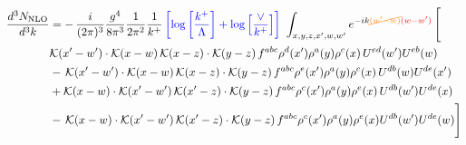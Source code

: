 \documentclass[aps,prd,amsmath,amssymb,nofootinbib]{revtex4-2}
\numberwithin{equation}{section}
\begin{document}
\begin{align}
    \frac{d^{3}N_{\rm NLO}}{d^{3}k} & = -\,\frac{i}{(2\pi)^{3}}\frac{g^{4}}{8\pi^{3}}\frac{1}{2\pi^{2}} \frac{1}{k^{+}}\,{\color{blue}\left[\log{\left[\frac{k^{+}}{\Lambda}\right]}+\log{\left[\frac{\vee}{k^{+}}\right]}\right]}\,\,\int_{x,y,z,x^{\prime},w,w^{\prime}}e^{-ik{\color{orange}\cancel{(w^{\prime}-w)}}{\color{red}(w-w^{\prime})}}\, \Bigg[\notag \\ &  \mathcal{K}(x'-w')\cdot \mathcal{K}(x-w)\, \mathcal{K}(x-z)\cdot \mathcal{K}(y-z)\, f^{a b c} \rho^{d}(x') \rho^{a}(y) \rho^{c}(x)\,U^{ed}(w') U^{e b}(w) \nonumber\\
    &  -\,\mathcal{K}(x'-w')\cdot \mathcal{K}(x-w)\, \mathcal{K}(x-z)\cdot \mathcal{K}(y-z)\, f^{a b c} \rho^{e}(x') \rho^{a}(y) \rho^{c}(x)\, U^{d b}(w) U^{de}(x')\nonumber\\
    & + \mathcal{K}(x-w)\cdot \mathcal{K}(x'-w')\, \mathcal{K}(x'-z)\cdot \mathcal{K}(y-z)\, f^{a b c} \rho^{c}(x') \rho^{a}(y) \rho^{e}(x)\,U^{d b}(w') U^{de}(x) \nonumber\\
    & -\,\mathcal{K}(x-w)\cdot \mathcal{K}(x'-w')\, \mathcal{K}(x'-z)\cdot \mathcal{K}(y-z)\, f^{a b c} \rho^{c}(x') \rho^{a}(y) \rho^{e}(x) U^{db}(w') U^{de}(w)\Bigg]
\end{align}
\end{document}
